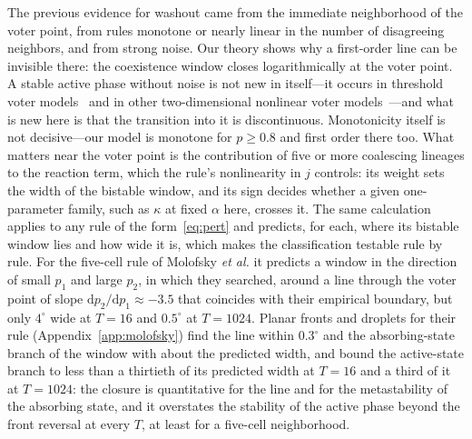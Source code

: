 \documentclass[pre,twocolumn,superscriptaddress,showpacs,floatfix]{revtex4-2}
\newcommand{\ds}{\mathrm{d}}
\begin{document}
The previous evidence for washout came from the immediate neighborhood of the voter point, from
rules monotone or nearly linear in the number of disagreeing neighbors, and from strong noise.
Our theory shows why a first-order line can be invisible there: the coexistence window closes
logarithmically at the voter point. A stable active phase without noise is not new in itself---it
occurs in threshold voter models~\cite{liggett1994} and in other two-dimensional nonlinear voter
models~\cite{molofsky1999,lambiotte2007,schweitzer2009}---and what is new here is that the
transition into it is discontinuous. Monotonicity itself is not decisive---our model is monotone
for $p\ge 0.8$ and first order there too. What matters near the voter point is the
contribution of five or more coalescing lineages to the reaction term, which the rule's
nonlinearity in $j$ controls: its weight sets the width of the bistable window, and its sign
decides whether a given one-parameter family, such as $\kappa$ at fixed $\alpha$ here, crosses
it. The same calculation applies to any rule of the form~\eqref{eq:pert} and predicts, for each,
where its bistable window lies and how wide it is, which makes the classification testable rule
by rule. For the five-cell rule of Molofsky \emph{et al.} it predicts a window in the direction
of small $p_1$ and large $p_2$, in which they searched, around a line through the voter point of
slope $\ds p_2/\ds p_1\approx -3.5$ that coincides with their empirical boundary, but only
$4^\circ$ wide at $T = 16$ and $0.5^\circ$ at $T = 1024$. Planar fronts and droplets for their
rule (Appendix~\ref{app:molofsky}) find the line within $0.3^\circ$ and the absorbing-state
branch of the window with about the predicted width, and bound the active-state branch to less
than a thirtieth of its predicted width at $T = 16$ and a third of it at $T = 1024$: the closure
is quantitative for the line and for the metastability of the absorbing state, and it overstates
the stability of the active phase beyond the front reversal at every $T$, at least for a
five-cell neighborhood.
\end{document}
